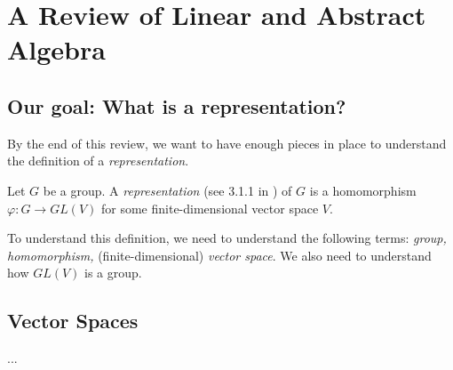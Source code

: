 \section{A Review of Linear and Abstract Algebra}

\subsection{Our goal: What is a representation?}
By the end of this review, we want to have enough pieces in place to understand
the definition of a \textit{representation}.

\begin{defn}
Let $G$ be a group. A \textit{representation} (see 3.1.1 in \cite{steinberg})
of $G$ is a homomorphism $\varphi : G \to GL(V)$ for some finite-dimensional
vector space $V$.
\end{defn}

To understand this definition, we need to understand the following terms:
\textit{group, homomorphism,} (finite-dimensional) \textit{vector space}. We
also need to understand how $GL(V)$ is a group.

\subsection{Vector Spaces}

...
